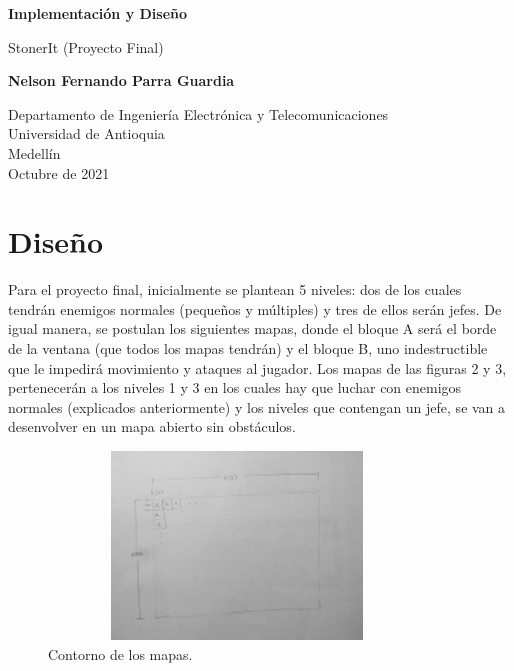 \documentclass{article}
\begin{document}
\begin{titlepage}
    \begin{center}
        \vspace*{1cm}
            
        \Huge
        \textbf{Implementación y Diseño}
            
        \vspace{0.5cm}
        \LARGE
        StonerIt (Proyecto Final)
            
        \vspace{1.5cm}
            
        \textbf{Nelson Fernando Parra Guardia}
            
        \vfill
            
        \vspace{0.8cm}
            
        \Large
        Departamento de Ingeniería Electrónica y Telecomunicaciones\\
        Universidad de Antioquia\\
        Medellín\\
        Octubre de 2021
            
    \end{center}
\end{titlepage}

\newpage
\section{Diseño}
Para el proyecto final, inicialmente se plantean 5 niveles: dos de los cuales tendrán enemigos normales (pequeños y múltiples) y tres de ellos serán jefes. De igual manera, se postulan los siguientes mapas, donde el bloque A será el borde de la ventana (que todos los mapas tendrán) y el bloque B, uno indestructible que le impedirá movimiento y ataques al jugador. Los mapas de las figuras 2 y 3, pertenecerán a los niveles 1 y 3 en los cuales hay que luchar con enemigos normales (explicados anteriormente) y los niveles que contengan un jefe, se van a desenvolver en un mapa abierto sin obstáculos.

\begin{figure}[h]
\includegraphics[width=10cm, height=5cm]{imagenes/bordes.jpg}
\centering
\caption{Contorno de los mapas.}
\end{figure}
\end{document}
